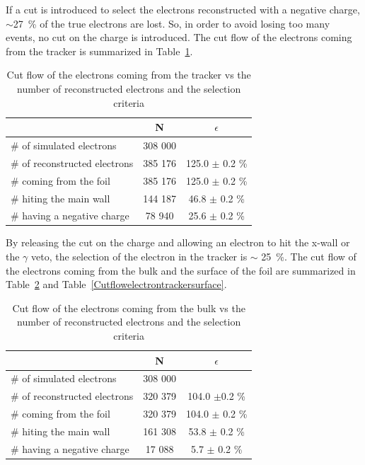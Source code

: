 \documentclass[main.tex]{subfiles}
\begin{document}
\bigskip 


\noindent If a cut is introduced to select the electrons reconstructed with a negative charge, $\sim$27~\% of the true electrons are lost. So, in order to avoid losing too many events, no cut on the charge is introduced. The cut flow of the electrons coming from the tracker is summarized in Table~\ref{Cutflowelectrontracker}. 

\begin{table}[h!]
\begin{center}
\begin{tabular}{l|c|c}
 & N & $\epsilon$ \\
\toprule
$\#$ of simulated electrons & 308 000 & \\
\hline
$\#$ of reconstructed electrons & 385 176 & 125.0 $\pm$ 0.2 \% \\
$\#$ coming from the foil       & 385 176 & 125.0 $\pm$ 0.2 \%\\
$\#$ hiting the main wall       & 144 187 & 46.8  $\pm$ 0.2 \%\\
$\#$ having a negative charge   & 78 940  & 25.6  $\pm$ 0.2 \%\\
\bottomrule
\end{tabular}
\end{center}
\caption{Cut flow of the electrons coming from the tracker vs the number of reconstructed electrons and the selection criteria}
\label{Cutflowelectrontracker}
\end{table}


\bigskip


\noindent By releasing the cut on the charge and allowing an electron to hit the x-wall or the $\gamma$ veto, the selection of the electron in the tracker is $\sim$ 25~\%. The cut flow of the electrons coming from the bulk and the surface of the foil are summarized in Table~\ref{Cutflowelectrontrackerbulk} and Table~\ref{Cutflowelectrontrackersurface}.


\begin{table}[h!]
\begin{center}
\begin{tabular}{l|c|c}
 & N & $\epsilon$ \\
\toprule
$\#$ of simulated electrons & 308 000 & \\
\hline
$\#$ of reconstructed electrons & 320 379 & 104.0 $\pm $0.2 \% \\
$\#$ coming from the foil       & 320 379 & 104.0 $\pm$ 0.2 \%\\
$\#$ hiting the main wall       & 161 308 & 53.8 $\pm$ 0.2 \%\\
$\#$ having a negative charge   & 17 088  & 5.7 $\pm$ 0.2 \%\\
\bottomrule
\end{tabular}
\end{center}
\caption{Cut flow of the electrons coming from the bulk vs the number of reconstructed electrons and the selection criteria}
\label{Cutflowelectrontrackerbulk}
\end{table}
\end{document}
